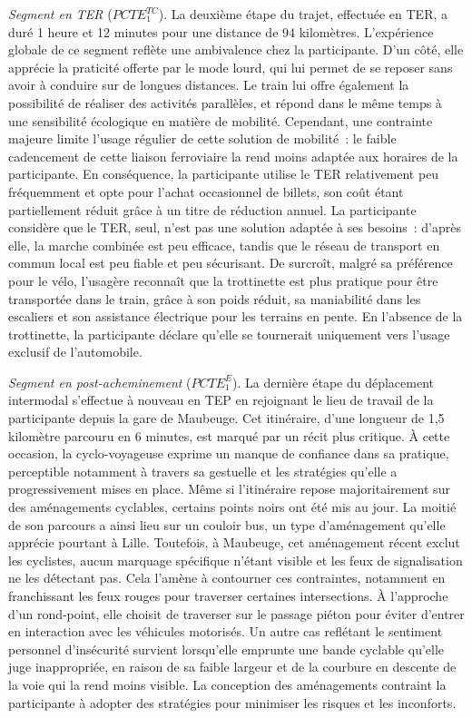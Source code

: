 \begin{refsegment}
\textsl{Segment en \acrshort{TER}} (\(PCTE^{TC}_{1}\)). La deuxième étape du trajet, effectuée en \acrshort{TER}, a duré 1 heure et 12 minutes pour une distance de 94 kilomètres. L’expérience globale de ce segment reflète une ambivalence chez la participante. D’un côté, elle apprécie la praticité offerte par le mode lourd, qui lui permet de se reposer sans avoir à conduire sur de longues distances. Le train lui offre également la possibilité de réaliser des activités parallèles, et répond dans le même temps à une sensibilité écologique en matière de mobilité. Cependant, une contrainte majeure limite l'usage régulier de cette solution de mobilité~: le faible cadencement de cette liaison ferroviaire la rend moins adaptée aux horaires de la participante. En conséquence, la participante utilise le \acrshort{TER} relativement peu fréquemment et opte pour l’achat occasionnel de billets, son coût étant partiellement réduit grâce à un titre de réduction annuel. La participante considère que le \acrshort{TER}, seul, n’est pas une solution adaptée à ses besoins~: d'après elle, la marche combinée est peu efficace, tandis que le réseau de transport en commun local est peu fiable et peu sécurisant. De surcroît, malgré sa préférence pour le vélo, l'usagère reconnaît que la trottinette est plus pratique pour être transportée dans le train, grâce à son poids réduit, sa maniabilité dans les escaliers et son assistance électrique pour les terrains en pente. En l’absence de la trottinette, la participante déclare qu’elle se tournerait uniquement vers l'usage exclusif de l’automobile.%

\textsl{Segment en post-acheminement} (\(PCTE^{E}_{1}\)). La dernière étape du déplacement intermodal s’effectue à nouveau en \acrshort{TEP} en rejoignant le lieu de travail de la participante depuis la gare de Maubeuge. Cet itinéraire, d’une longueur de 1,5 kilomètre parcouru en 6 minutes, est marqué par un récit plus critique. À cette occasion, la cyclo-voyageuse exprime un manque de confiance dans sa pratique, perceptible notamment à travers sa gestuelle et les stratégies qu’elle a progressivement mises en place. Même si l’itinéraire repose majoritairement sur des aménagements cyclables, certains points noirs ont été mis au jour. La moitié de son parcours a ainsi lieu sur un couloir bus, un type d’aménagement qu’elle apprécie pourtant à Lille. Toutefois, à Maubeuge, cet aménagement récent exclut les cyclistes, aucun marquage spécifique n’étant visible et les feux de signalisation ne les détectant pas. Cela l’amène à contourner ces contraintes, notamment en franchissant les feux rouges pour traverser certaines intersections. À l’approche d’un rond-point, elle choisit de traverser sur le passage piéton pour éviter d’entrer en interaction avec les véhicules motorisés. Un autre cas reflétant le sentiment personnel d’insécurité survient lorsqu’elle emprunte une bande cyclable qu’elle juge inappropriée, en raison de sa faible largeur et de la courbure en descente de la voie qui la rend moins visible. La conception des aménagements contraint la participante à adopter des stratégies pour minimiser les risques et les inconforts.%


\end{refsegment}

